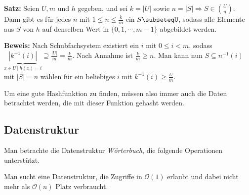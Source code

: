 \documentclass{scrartcl}%
\begin{document}
    \vspace*{0.3cm}
    \textbf{\textsf{Satz:}} Seien $U,m$ und $h$ gegeben, und sei $k=|U|$ sowie $n=|S| \Rightarrow S \in \binom{U}{n}$.
    Dann gibt es für jedes $n$ mit $1 \leq n \leq \frac{k}{m}$ ein $S\subseteqU$, sodass alle Elemente aus $S$ von $h$ auf denselben Wert in $\{0,1,\cdots,m-1\}$ abgebildet werden.

    \vspace*{0.3cm}
    \textbf{\textsf{Beweis:}} Nach Schubfachsystem existiert ein $i$ mit $0 \leq i < m$, sodass $\underbrace{|k^{-1}(i)|}_{x \in U\ |\ h(x)=i} \supseteq \frac{|U|}{m} = \frac{k}{m}$.
    Nach Annahme ist $\frac{k}{m}\geq n$.
    Man kann nun $S \subseteq n^{-1}(i)$ mit $|S|=n$ wählen für ein beliebiges $i$ mit $k^{-1}(i)\geq \frac{U}{m}$.

    Um eine gute Hashfunktion zu finden, müssen also immer auch die Daten betrachtet werden, die mit dieser Funktion gehasht werden.
    \newpage
    \subsection*{Datenstruktur}\label{subsec:datenstruktur}
    Man betrachte die Datenstruktur \textit{Wörterbuch}, die folgende Operationen unterstützt.

    \begin{figure}[H]
        \centering
    \end{figure}
    Man sucht eine Datenstruktur, die Zugriffe in $\mathcal{O}(1)$ erlaubt und dabei nicht mehr als $\mathcal{O}(n)$ Platz verbraucht.
\end{document}
